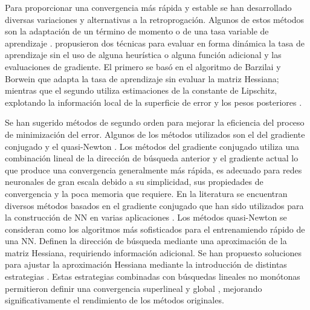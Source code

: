 Para proporcionar una convergencia más rápida y estable se han desarrollado diversas variaciones y alternativas a la retroprogación. Algunos de estos métodos son la adaptación de un término de momento \cite{Jacobs1988, Rumelhart1986b} o de una tasa variable de aprendizaje \cite{Jacobs1988,Vogl1988}.  propusieron dos técnicas para evaluar en forma dinámica la tasa de aprendizaje sin el uso de alguna heurística o alguna función adicional y las evaluaciones de gradiente. El primero se basó en el algoritmo de Barzilai y Borwein \cite{Barzilai1988} que adapta la tasa de aprendizaje sin evaluar la matriz Hessiana; mientras que el segundo utiliza estimaciones de la constante de Lipschitz, explotando la información local de la superficie de error y los pesos posteriores \cite{Magoulas1997}.%

Se han sugerido métodos de segundo orden  para mejorar la eficiencia del proceso de minimización del error. Algunos de los métodos utilizados son el del gradiente conjugado \cite{Fletcher1964, Hestenes1952, Polak1969} y el quasi-Newton \cite{Huang1970, Nocedal2006}. Los métodos del gradiente conjugado utiliza una combinación lineal de la dirección de búsqueda anterior y el gradiente actual lo que produce una convergencia generalmente más rápida, es adecuado para redes neuronales de gran escala debido a su simplicidad, sus propiedades de convergencia y la poca memoria que requiere. En la literatura  se encuentran diversos métodos basados en el gradiente conjugado \cite{Birgin2001, Moller1993} que han sido utilizados para la construcción de NN en varias aplicaciones \cite{Charalambous1992, Peng2007, Sotiropoulos2002}. Los métodos quasi-Newton se consideran como los algoritmos más sofisticados para el entrenamiendo rápido de una NN. Definen la dirección de búsqueda mediante una aproximación de la matriz Hessiana, requiriendo información adicional. Se han propuesto soluciones para ajustar la aproximación Hessiana mediante la introducción de distintas estrategias \cite{Al-Baali1998, Nocedal1993, Oren1972, Oren1974, Yin2007}. Estas estrategias combinadas con búsquedas lineales no monótonas permitieron definir una convergencia superlineal y global \cite{Yin2007}, mejorando significativamente el rendimiento de los métodos originales.

















